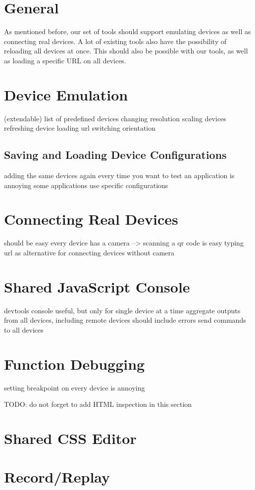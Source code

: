 \section{General}

As mentioned before, our set of tools should support emulating devices as well as connecting real devices. A lot of existing tools also have the possibility of reloading all devices at once. This should also be possible with our tools, as well as loading a specific URL on all devices. 

\section{Device Emulation}

(extendable) list of predefined devices
changing resolution
scaling devices
refreshing device
loading url
switching orientation

\subsection{Saving and Loading Device Configurations}

adding the same devices again every time you want to test an application is annoying
some applications use specific configurations

\section{Connecting Real Devices}

should be easy
every device has a camera --> scanning a qr code is easy
typing url as alternative for connecting devices without camera

\section{Shared JavaScript Console}

devtools console useful, but only for single device at a time
aggregate outputs from all devices, including remote devices
should include errors
send commands to all devices

\section{Function Debugging}
setting breakpoint on every device is annoying

TODO: do not forget to add HTML inspection in this section

\section{Shared CSS Editor}

\section{Record/Replay}